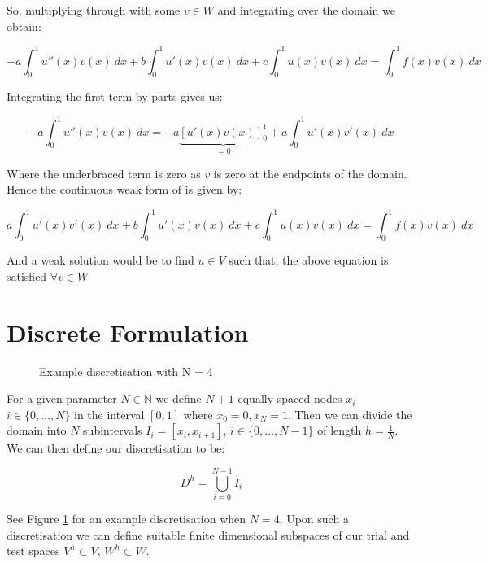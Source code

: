 So, multiplying through with some $v \in W$ and integrating over the domain we
obtain:

\begin{equation}
    -a\int_0^1{u''(x)v(x)\ dx} + b\int_0^1{u'(x)v(x)\ dx}
    + c\int_0^1{u(x)v(x)\ dx} = \int_0^1{f(x)v(x)\ dx}
\end{equation}

Integrating the first term by parts gives us:

\begin{equation}
    -a\int_0^1{u''(x)v(x)\ dx} = -a\underbrace{[ u'(x)v(x) ]_0^1}_{ = 0}
    + a\int_0^1{u'(x)v'(x)\ dx}
\end{equation}

Where the underbraced term is zero as $v$ is zero at the endpoints of the
domain. Hence the continuous weak form of  is given
by:

\begin{equation}\label{eq:wk-oned-deterministic}
    a\int_0^1{u'(x)v'(x)\ dx} + b\int_0^1{u'(x)v(x)\ dx}
    + c\int_0^1{u(x)v(x)\ dx} = \int_0^1{f(x)v(x)\ dx}
\end{equation}

And a weak solution would be to find $u \in V$ such that, the above equation is
satisfied $\forall v \in W$

\section{Discrete Formulation}

\begin{figure}
\centering

\caption{Example discretisation with N = 4}
\label{fig:one-d-discretisation}
\end{figure}

For a given parameter $N \in \mathbb{N}$ we define $N+1$ equally spaced nodes
$x_i$ $i \in \{0, \ldots, N\}$ in the interval $[0,1]$ where
$x_0 = 0, x_N = 1$. Then we can divide the domain into $N$ subintervals
$ I_i = [x_i, x_{i+1}]$, $i \in \{0,\ldots,N - 1\}$ of length $h = \frac{1}{N}$.
We can then define our discretisation to be:

\[
    D^h = \bigcup_{i=0}^{N - 1} I_i
\]

See Figure \ref{fig:one-d-discretisation} for an example discretisation
when $N=4$.  Upon such a discretisation we can define suitable finite
dimensional subspaces of our trial and test spaces $V^h \subset V$, $W^h
\subset W$.

